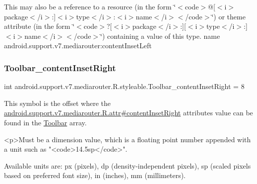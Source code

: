 This may also be a reference to a resource (in the form \char`\"{}$<$code$>$@\mbox{[}$<$i$>$package$<$/i$>$\+:\mbox{]}$<$i$>$type$<$/i$>$\+:$<$i$>$name$<$/i$>$$<$/code$>$\char`\"{}) or theme attribute (in the form \char`\"{}$<$code$>$?\mbox{[}$<$i$>$package$<$/i$>$\+:\mbox{]}\mbox{[}$<$i$>$type$<$/i$>$\+:\mbox{]}$<$i$>$name$<$/i$>$$<$/code$>$\char`\"{}) containing a value of this type.  name android.\+support.\+v7.\+mediarouter\+:content\+Inset\+Left \mbox{\label{classandroid_1_1support_1_1v7_1_1mediarouter_1_1R_1_1styleable_ad92866111ec3cf5e0b183e9fba9b637e}} 
\subsubsection{\texorpdfstring{Toolbar\+\_\+content\+Inset\+Right}{Toolbar\_contentInsetRight}}
{\footnotesize\ttfamily int android.\+support.\+v7.\+mediarouter.\+R.\+styleable.\+Toolbar\+\_\+content\+Inset\+Right = 8\hspace{0.3cm}{\ttfamily [static]}}

This symbol is the offset where the \hyperlink{classandroid_1_1support_1_1v7_1_1mediarouter_1_1R_1_1attr_ac57c06096a1114b7df0d88f8fe7d666b}{android.\+support.\+v7.\+mediarouter.\+R.\+attr\#content\+Inset\+Right} attribute\textquotesingle{}s value can be found in the \hyperlink{classandroid_1_1support_1_1v7_1_1mediarouter_1_1R_1_1styleable_a6815cdfaadde30c82b955863af196899}{Toolbar} array.

\begin{DoxyVerb}      <p>Must be a dimension value, which is a floating point number appended with a unit such as "<code>14.5sp</code>".
\end{DoxyVerb}
 Available units are\+: px (pixels), dp (density-\/independent pixels), sp (scaled pixels based on preferred font size), in (inches), mm (millimeters). 

